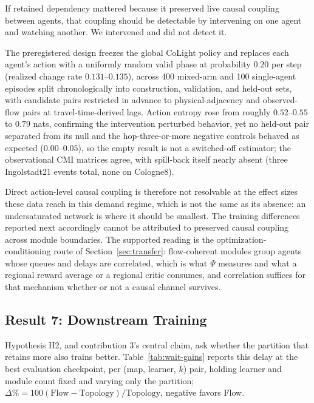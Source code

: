 \documentclass[journal]{IEEEtran}
\theoremstyle{definition}
\begin{document}
If retained dependency mattered because it preserved live causal coupling between agents, that coupling should be detectable by intervening on one agent and watching another.
We intervened and did not detect it.

The preregistered design freezes the global CoLight policy and replaces each agent's action with a uniformly random valid phase at probability $0.20$ per step (realized change rate $0.131$--$0.135$), across 400 mixed-arm and 100 single-agent episodes split chronologically into construction, validation, and held-out sets, with candidate pairs restricted in advance to physical-adjacency and observed-flow pairs at travel-time-derived lags. Action entropy rose from roughly $0.52$--$0.55$ to $0.79$ nats, confirming the intervention perturbed behavior, yet no held-out pair separated from its null and the hop-three-or-more negative controls behaved as expected ($0.00$--$0.05$), so the empty result is not a switched-off estimator; the observational CMI matrices agree, with spill-back itself nearly absent (three Ingolstadt21 events total, none on Cologne8).

Direct action-level causal coupling is therefore not resolvable at the effect sizes these data reach in this demand regime, which is not the same as its absence: an undersaturated network is where it should be smallest. The training differences reported next accordingly cannot be attributed to preserved causal coupling across module boundaries. The supported reading is the optimization-conditioning route of Section~\ref{sec:transfer}: flow-coherent modules group agents whose queues and delays are correlated, which is what $\Psi$ measures and what a regional reward average or a regional critic consumes, and correlation suffices for that mechanism whether or not a causal channel survives.

\subsection{Result 7: Downstream Training}
\label{sec:exp-perf}

Hypothesis H2, and contribution 3's central claim, ask whether the partition that retains more also trains better. Table~\ref{tab:wait-gains} reports this delay at the best evaluation checkpoint, per (map, learner, $k$) pair, holding learner and module count fixed and varying only the partition; $\Delta\%=100(\text{Flow}-\text{Topology})/\text{Topology}$, negative favors Flow.
\end{document}

